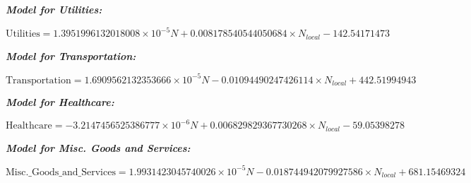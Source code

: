 \begin{appendices}
    \textbf{\textit{Model for Utilities: }}
    
    $\text{Utilities} = 1.3951996132018008 \times 10^{-5} N + 0.008178540544050684 \times N_{local} - 142.54171473$
    
    \textbf{\textit{Model for Transportation: }}
    
    $\text{Transportation} = 1.6909562132353666 \times 10^{-5} N - 0.01094490247426114 \times N_{local} + 442.51994943$
    
    \textbf{\textit{Model for Healthcare: }}
    
    $\text{Healthcare} = -3.2147456525386777 \times 10^{-6} N + 0.006829829367730268 \times N_{local} - 59.05398278$
    
    \textbf{\textit{Model for Misc. Goods and Services: }}
    
    $\text{Misc.\_Goods\_and\_Services} = 1.9931423045740026 \times 10^{-5} N - 0.018744942079927586 \times N_{local} + 681.15469324$
    

  \end{appendices}